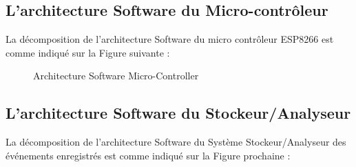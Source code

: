 \subsection{L’architecture Software du Micro-contrôleur}
La décomposition de l’architecture Software du micro contrôleur ESP8266 est comme indiqué sur la Figure suivante : 
\begin{figure}[hbt]
\centering
\right
\label{fig:Architecture Software Micro-Controlleur}
\caption{Architecture Software Micro-Controller}
\end{figure}


\newpage
\subsection{L’architecture Software du Stockeur/Analyseur }
La décomposition de l’architecture Software du Système Stockeur/Analyseur des événements enregistrés est comme indiqué sur la Figure prochaine :

